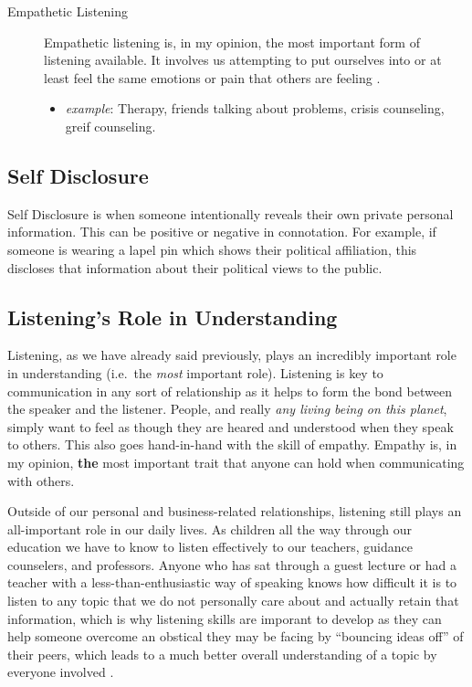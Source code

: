 \documentclass[stu,12pt]{apa7}
\begin{document}
\begin{description}
\begin{itemize}
          \end{itemize}
        \item[Empathetic Listening]
          Empathetic listening is, in my opinion, the most important form of
            listening available. It involves us attempting to put ourselves into
            or at least feel the same emotions or pain that others are feeling
            \parencite[pp. 335--336]{noauthor_communication_2013}.
          \begin{itemize}
            \item \textit{example}: Therapy, friends talking about problems,
              crisis counseling, greif counseling.
          \end{itemize}
      \end{description}

    \subsection{Self Disclosure}
      Self Disclosure is when someone intentionally reveals their own private
        personal information. This can be positive or negative in connotation.
        For example, if someone is wearing a lapel pin which shows their
        political affiliation, this discloses that information about their
        political views to the public.

    \subsection{Listening's Role in Understanding}
      Listening, as we have already said previously, plays an incredibly
        important role in understanding (i.e.\ the \textit{most} important role).
        Listening is key to communication in any sort of relationship as it
        helps to form the bond between the speaker and the listener. People,
        and really \textit{any living being on this planet}, simply want to feel
        as though they are heared and understood when they speak to others. This
        also goes hand-in-hand with the skill of empathy. Empathy is, in my
        opinion, \textbf{the} most important trait that anyone can hold when
        communicating with others.

      Outside of our personal and business-related relationships, listening
        still plays an all-important role in our daily lives. As children
        all the way through our education we have to know to listen effectively
        to our teachers, guidance counselers, and professors. Anyone who has
        sat through a guest lecture or had a teacher with a
        less-than-enthusiastic way of speaking knows how difficult it is to
        listen to any topic that we do not personally care about and actually
        retain that information, which is why listening skills are imporant to
        develop as they can help someone overcome an obstical they may be facing
        by ``bouncing ideas off'' of their peers, which leads to a much better
        overall understanding of a topic by everyone involved
        \parencite[pp. 5]{caspersz_can_nodate}.
\end{document}
